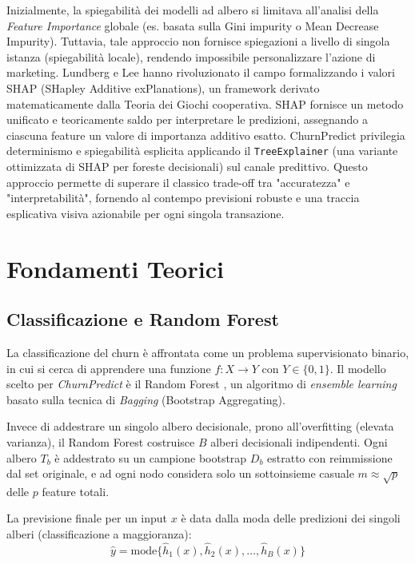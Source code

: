 \documentclass[11pt,a4paper]{article}
\begin{document}
Inizialmente, la spiegabilità dei modelli ad albero si limitava all'analisi della \textit{Feature Importance} globale (es. basata sulla Gini impurity o Mean Decrease Impurity). Tuttavia, tale approccio non fornisce spiegazioni a livello di singola istanza (spiegabilità locale), rendendo impossibile personalizzare l'azione di marketing. Lundberg e Lee \cite{lundberg2017} hanno rivoluzionato il campo formalizzando i valori SHAP (SHapley Additive exPlanations), un framework derivato matematicamente dalla Teoria dei Giochi cooperativa. SHAP fornisce un metodo unificato e teoricamente saldo per interpretare le predizioni, assegnando a ciascuna feature un valore di importanza additivo esatto. 
ChurnPredict privilegia determinismo e spiegabilità esplicita applicando il \texttt{TreeExplainer} (una variante ottimizzata di SHAP per foreste decisionali) sul canale predittivo. Questo approccio permette di superare il classico trade-off tra "accuratezza" e "interpretabilità", fornendo al contempo previsioni robuste e una traccia esplicativa visiva azionabile per ogni singola transazione.

\section{Fondamenti Teorici}
\subsection{Classificazione e Random Forest}
La classificazione del churn è affrontata come un problema supervisionato binario, in cui si cerca di apprendere una funzione $f: X \rightarrow Y$ con $Y \in \{0, 1\}$. Il modello scelto per \textit{ChurnPredict} è il Random Forest \cite{breiman2001}, un algoritmo di \textit{ensemble learning} basato sulla tecnica di \textit{Bagging} (Bootstrap Aggregating). 

Invece di addestrare un singolo albero decisionale, prono all'overfitting (elevata varianza), il Random Forest costruisce $B$ alberi decisionali indipendenti. Ogni albero $T_b$ è addestrato su un campione bootstrap $D_b$ estratto con reimmissione dal set originale, e ad ogni nodo considera solo un sottoinsieme casuale $m \approx \sqrt{p}$ delle $p$ feature totali.

La previsione finale per un input $x$ è data dalla moda delle predizioni dei singoli alberi (classificazione a maggioranza):
\begin{equation}
\hat{y} = \text{mode} \{ \hat{h}_1(x), \hat{h}_2(x), \dots, \hat{h}_B(x) \}
\end{equation}
\end{document}
